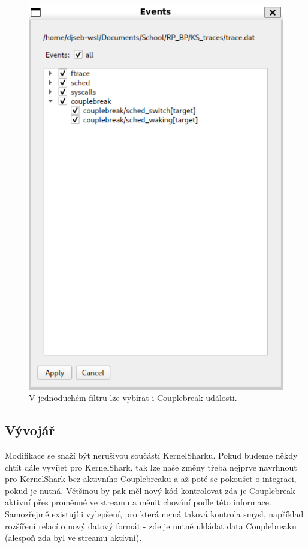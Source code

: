 \begin{figure}[p]\centering
    \includegraphics[width=140mm]{img/Modifikace/modif-couplebreak-filter}
    \caption{V jednoduchém filtru lze vybírat i Couplebreak události.}
    \label{cbreak-filter}
\end{figure}

\subsection{Vývojář}

Modifikace se snaží být nerušivou součástí KernelSharku. Pokud budeme někdy chtít dále vyvíjet pro KernelShark, tak lze naše změny třeba nejprve navrhnout pro KernelShark bez aktivního Couplebreaku a až poté se pokoušet o integraci, pokud je nutná. Většinou by pak měl nový kód kontrolovat zda je Couplebreak aktivní přes proměnné ve streamu a měnit chování podle této informace. Samozřejmě existují i vylepšení, pro která nemá taková kontrola smysl, například rozšíření relací o nový datový formát - zde je nutné ukládat data Couplebreaku (alespoň zda byl ve streamu aktivní).

